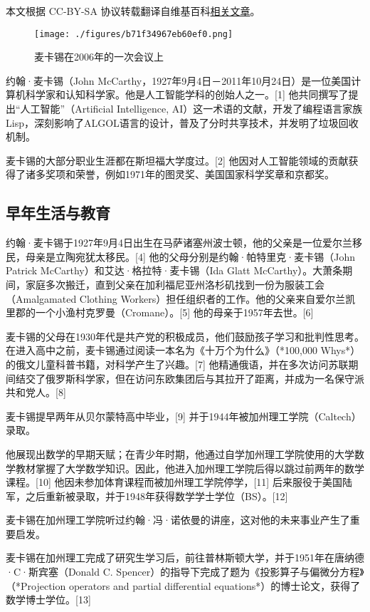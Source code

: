
本文根据 CC-BY-SA 协议转载翻译自维基百科\href{https://en.wikipedia.org/wiki/John_McCarthy_(computer_scientist)}{相关文章}。

\begin{figure}[ht]
\centering
\texttt{[image: ./figures/b71f34967eb60ef0.png]}
\caption{麦卡锡在2006年的一次会议上} \label{fig_YHMKX_1}
\end{figure}
约翰·麦卡锡（John McCarthy，1927年9月4日－2011年10月24日）是一位美国计算机科学家和认知科学家。他是人工智能学科的创始人之一。[1] 他共同撰写了提出“人工智能”（Artificial Intelligence, AI）这一术语的文献，开发了编程语言家族Lisp，深刻影响了ALGOL语言的设计，普及了分时共享技术，并发明了垃圾回收机制。

麦卡锡的大部分职业生涯都在斯坦福大学度过。[2] 他因对人工智能领域的贡献获得了诸多奖项和荣誉，例如1971年的图灵奖、美国国家科学奖章和京都奖。
\subsection{早年生活与教育}
约翰·麦卡锡于1927年9月4日出生在马萨诸塞州波士顿，他的父亲是一位爱尔兰移民，母亲是立陶宛犹太移民。[4] 他的父母分别是约翰·帕特里克·麦卡锡（John Patrick McCarthy）和艾达·格拉特·麦卡锡（Ida Glatt McCarthy）。大萧条期间，家庭多次搬迁，直到父亲在加利福尼亚州洛杉矶找到一份为服装工会（Amalgamated Clothing Workers）担任组织者的工作。他的父亲来自爱尔兰凯里郡的一个小渔村克罗曼（Cromane）。[5] 他的母亲于1957年去世。[6]

麦卡锡的父母在1930年代是共产党的积极成员，他们鼓励孩子学习和批判性思考。在进入高中之前，麦卡锡通过阅读一本名为《十万个为什么》（*100,000 Whys*）的俄文儿童科普书籍，对科学产生了兴趣。[7] 他精通俄语，并在多次访问苏联期间结交了俄罗斯科学家，但在访问东欧集团后与其拉开了距离，并成为一名保守派共和党人。[8]

麦卡锡提早两年从贝尔蒙特高中毕业，[9] 并于1944年被加州理工学院（Caltech）录取。

他展现出数学的早期天赋；在青少年时期，他通过自学加州理工学院使用的大学数学教材掌握了大学数学知识。因此，他进入加州理工学院后得以跳过前两年的数学课程。[10] 他因未参加体育课程而被加州理工学院停学，[11] 后来服役于美国陆军，之后重新被录取，并于1948年获得数学学士学位（BS）。[12]

麦卡锡在加州理工学院听过约翰·冯·诺依曼的讲座，这对他的未来事业产生了重要启发。

麦卡锡在加州理工完成了研究生学习后，前往普林斯顿大学，并于1951年在唐纳德·C·斯宾塞（Donald C. Spencer）的指导下完成了题为《投影算子与偏微分方程》（*Projection operators and partial differential equations*）的博士论文，获得了数学博士学位。[13]
